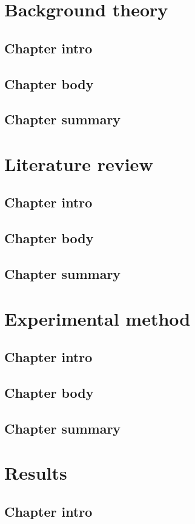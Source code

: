 \chapter{Background theory}
   \section{Chapter intro}
   \section{Chapter body}
   \section{Chapter summary}

\chapter{Literature review}
   \section{Chapter intro}
   \section{Chapter body}
   \section{Chapter summary}

\chapter{Experimental method}
   \section{Chapter intro}
   \section{Chapter body}
   \section{Chapter summary}

\chapter{Results}
   \section{Chapter intro}
